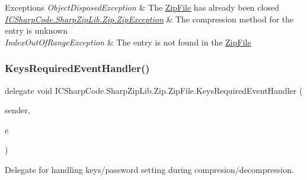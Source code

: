 \begin{DoxyExceptions}{Exceptions}
{\em Object\+Disposed\+Exception} & The \hyperlink{class_i_c_sharp_code_1_1_sharp_zip_lib_1_1_zip_1_1_zip_file}{Zip\+File} has already been closed \\
\hline
{\em \hyperlink{class_i_c_sharp_code_1_1_sharp_zip_lib_1_1_zip_1_1_zip_exception}{I\+C\+Sharp\+Code.\+Sharp\+Zip\+Lib.\+Zip.\+Zip\+Exception}} & The compression method for the entry is unknown \\
\hline
{\em Index\+Out\+Of\+Range\+Exception} & The entry is not found in the \hyperlink{class_i_c_sharp_code_1_1_sharp_zip_lib_1_1_zip_1_1_zip_file}{Zip\+File} \\
\hline
\end{DoxyExceptions}
\mbox{\label{class_i_c_sharp_code_1_1_sharp_zip_lib_1_1_zip_1_1_zip_file_ab2c704e700f9b0c079f12a4c5ea775f4}} 
\subsubsection{\texorpdfstring{Keys\+Required\+Event\+Handler()}{KeysRequiredEventHandler()}}
{\footnotesize\ttfamily delegate void I\+C\+Sharp\+Code.\+Sharp\+Zip\+Lib.\+Zip.\+Zip\+File.\+Keys\+Required\+Event\+Handler (\begin{DoxyParamCaption}\item[{object}]{sender,  }\item[{\hyperlink{class_i_c_sharp_code_1_1_sharp_zip_lib_1_1_zip_1_1_keys_required_event_args}{Keys\+Required\+Event\+Args}}]{e }\end{DoxyParamCaption})}



Delegate for handling keys/password setting during compresion/decompression. 

\mbox{\label{class_i_c_sharp_code_1_1_sharp_zip_lib_1_1_zip_1_1_zip_file_a13268d97706639a7d97d38ee014beeb9}} 
